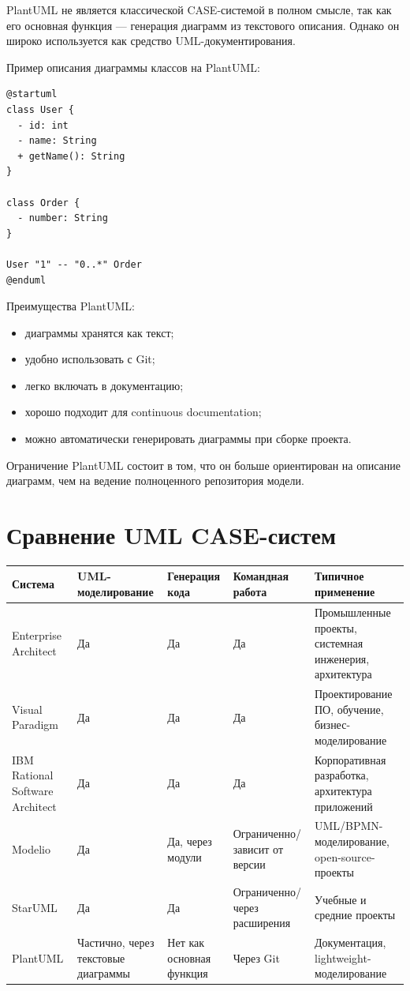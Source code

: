 \documentclass[12pt,a4paper]{article}
\begin{document}
PlantUML не является классической CASE-системой в полном смысле, так как его основная функция --- генерация диаграмм из текстового описания. Однако он широко используется как средство UML-документирования.

Пример описания диаграммы классов на PlantUML:

\begin{verbatim}
@startuml
class User {
  - id: int
  - name: String
  + getName(): String
}

class Order {
  - number: String
}

User "1" -- "0..*" Order
@enduml
\end{verbatim}

Преимущества PlantUML:
\begin{itemize}
    \item диаграммы хранятся как текст;
    \item удобно использовать с Git;
    \item легко включать в документацию;
    \item хорошо подходит для continuous documentation;
    \item можно автоматически генерировать диаграммы при сборке проекта.
\end{itemize}

Ограничение PlantUML состоит в том, что он больше ориентирован на описание диаграмм, чем на ведение полноценного репозитория модели.

\section{Сравнение UML CASE-систем}

\begin{longtable}{p{}p{}p{}p{}p{}}
\toprule
\textbf{Система} & \textbf{UML-моделирование} & \textbf{Генерация кода} & \textbf{Командная работа} & \textbf{Типичное применение} \\
\midrule
Enterprise Architect &
Да &
Да &
Да &
Промышленные проекты, системная инженерия, архитектура \\
\addlinespace

Visual Paradigm &
Да &
Да &
Да &
Проектирование ПО, обучение, бизнес-моделирование \\
\addlinespace

IBM Rational Software Architect &
Да &
Да &
Да &
Корпоративная разработка, архитектура приложений \\
\addlinespace

Modelio &
Да &
Да, через модули &
Ограниченно/зависит от версии &
UML/BPMN-моделирование, open-source-проекты \\
\addlinespace

StarUML &
Да &
Да &
Ограниченно/через расширения &
Учебные и средние проекты \\
\addlinespace

PlantUML &
Частично, через текстовые диаграммы &
Нет как основная функция &
Через Git &
Документация, lightweight-моделирование \\
\bottomrule
\end{longtable}
\end{document}
